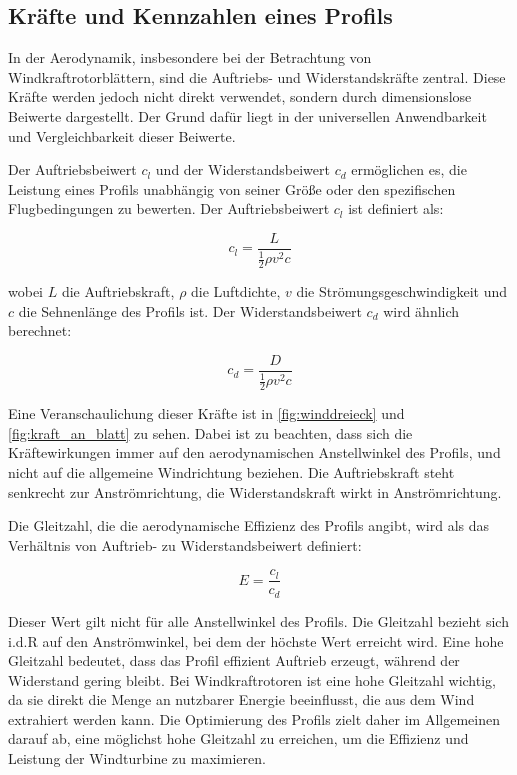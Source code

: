 \subsection{Kräfte und Kennzahlen eines Profils}

In der Aerodynamik, insbesondere bei der Betrachtung von Windkraftrotorblättern, sind die Auftriebs- und Widerstandskräfte zentral. Diese Kräfte werden jedoch nicht direkt verwendet, sondern durch dimensionslose Beiwerte dargestellt. Der Grund dafür liegt in der universellen Anwendbarkeit und Vergleichbarkeit dieser Beiwerte.

Der Auftriebsbeiwert \( c_l \) und der Widerstandsbeiwert \( c_d \) ermöglichen es, die Leistung eines Profils unabhängig von seiner Größe oder den spezifischen Flugbedingungen zu bewerten. Der Auftriebsbeiwert \( c_l \) ist definiert als:

\begin{equation}
c_l = \frac{L}{\frac{1}{2} \rho v^2 c}
\end{equation}

wobei \( L \) die Auftriebskraft, \( \rho \) die Luftdichte, \( v \) die Strömungsgeschwindigkeit und \( c \) die Sehnenlänge des Profils ist. Der Widerstandsbeiwert \( c_d \) wird ähnlich berechnet:

\begin{equation}
c_d = \frac{D}{\frac{1}{2} \rho v^2 c}
\end{equation}

Eine Veranschaulichung dieser Kräfte ist in \cref{fig:winddreieck} und \cref{fig:kraft_an_blatt} zu sehen. Dabei ist zu beachten, dass sich die Kräftewirkungen immer auf den aerodynamischen Anstellwinkel des Profils, und nicht auf die allgemeine Windrichtung beziehen. Die Auftriebskraft steht senkrecht zur Anströmrichtung, die Widerstandskraft wirkt in Anströmrichtung. 

Die Gleitzahl, die die aerodynamische Effizienz des Profils angibt, wird als das Verhältnis von Auftrieb- zu Widerstandsbeiwert definiert:

\begin{equation}
E = \frac{c_l}{c_d}
\end{equation}

Dieser Wert gilt nicht für alle Anstellwinkel des Profils. Die Gleitzahl bezieht sich i.d.R auf den Anströmwinkel, bei dem der höchste Wert erreicht wird.
Eine hohe Gleitzahl bedeutet, dass das Profil effizient Auftrieb erzeugt, während der Widerstand gering bleibt. 
Bei Windkraftrotoren ist eine hohe Gleitzahl wichtig, da sie direkt die Menge an nutzbarer Energie beeinflusst, die aus dem Wind extrahiert werden kann. Die Optimierung des Profils zielt daher im Allgemeinen darauf ab, eine möglichst hohe Gleitzahl zu erreichen, um die Effizienz und Leistung der Windturbine zu maximieren.

